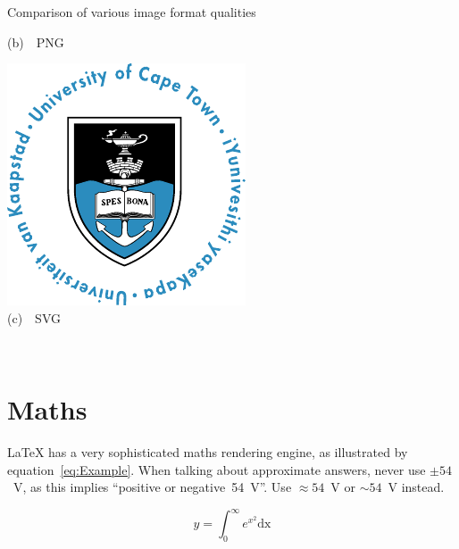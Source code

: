 \begin{FigureEnvironment}{Comparison of various image format qualities}
\begin{minipage}[b]{0.3\textwidth}
    {\small (b)~~PNG}%
  \end{minipage}
  \hfill
  \begin{minipage}[b]{0.3\textwidth}\centering\setlength{\parindent}{0mm}
    \includegraphics[width=\textwidth]{../Figures/UCT.pdf}\\%
    {\small (c)~~SVG}%
  \end{minipage}
  \hfill\mbox{}\\[1mm]
\end{FigureEnvironment}%

\section{Maths}

\LaTeX{} has a very sophisticated maths rendering engine, as illustrated by equation~\ref{eq:Example}.  When talking about approximate answers, never use $\pm{54}$~V, as this implies ``positive or negative~54~V''.  Use $\approx{54}$~V or $\sim{54}$~V instead.

\begin{equation}
  y = \int_0^\infty e^{x^2} \mathrm{dx}
  \label{eq:Example}
\end{equation}


